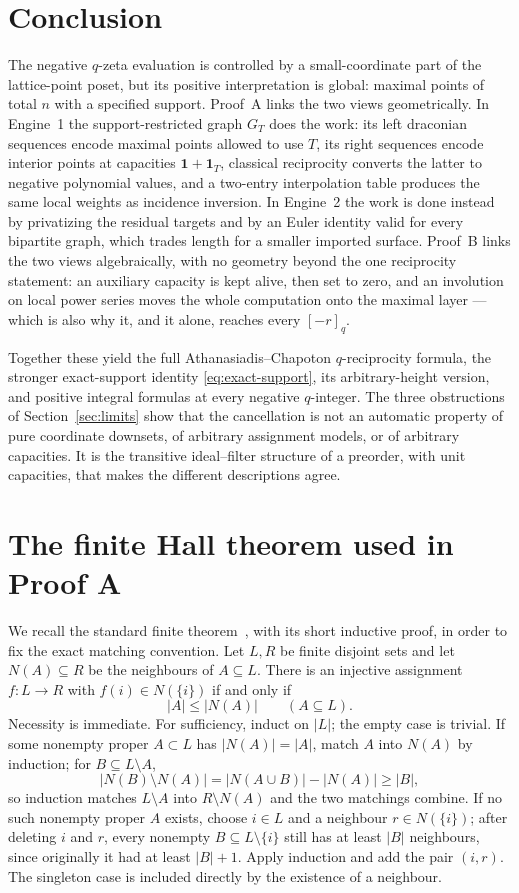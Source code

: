 \documentclass[11pt]{article}
\numberwithin{equation}{section}
\theoremstyle{definition}
\theoremstyle{remark}
\newcommand{\one}{\mathbf 1}
\newcommand{\qint}[1]{[#1]_q}
\begin{document}
\section{Conclusion}

The negative $q$-zeta evaluation is controlled by a small-coordinate part of
the lattice-point poset, but its positive interpretation is global: maximal
points of total $n$ with a specified support. Proof~A links the two views
geometrically. In Engine~1 the support-restricted graph $G_T$ does the work:
its left draconian sequences encode maximal points allowed to use $T$, its
right sequences encode interior points at capacities $\one+\one_T$, classical
reciprocity converts the latter to negative polynomial values, and a two-entry
interpolation table produces the same local weights as incidence inversion. In
Engine~2 the work is done instead by privatizing the residual targets and by
an Euler identity valid for every bipartite graph, which trades length for a
smaller imported surface. Proof~B links the two views algebraically, with no
geometry beyond the one reciprocity statement: an auxiliary capacity is kept
alive, then set to zero, and an involution on local power series moves the
whole computation onto the maximal layer --- which is also why it, and it
alone, reaches every $\qint{-r}$.

Together these yield the full Athanasiadis--Chapoton $q$-reciprocity formula,
the stronger exact-support identity \eqref{eq:exact-support}, its
arbitrary-height version, and positive integral formulas at every negative
$q$-integer. The three obstructions of Section~\ref{sec:limits} show that the
cancellation is not an automatic property of pure coordinate downsets, of
arbitrary assignment models, or of arbitrary capacities. It is the transitive
ideal--filter structure of a preorder, with unit capacities, that makes the
different descriptions agree.

\appendix

\section{The finite Hall theorem used in Proof A}
\label{app:hall}

We recall the standard finite theorem~\cite{Hall}, with its short inductive
proof, in order to fix the exact matching convention. Let $L,R$ be finite
disjoint sets and let $N(A)\subseteq R$ be the neighbours of $A\subseteq L$.
There is an injective assignment $f:L\to R$ with $f(i)\in N(\{i\})$ if and
only if
\[
 |A|\le|N(A)|\qquad(A\subseteq L).
\]
Necessity is immediate. For sufficiency, induct on $|L|$; the empty case is
trivial. If some nonempty proper $A\subset L$ has $|N(A)|=|A|$, match $A$ into
$N(A)$ by induction; for $B\subseteq L\setminus A$,
\[
 |N(B)\setminus N(A)|=|N(A\cup B)|-|N(A)|\ge|B| ,
\]
so induction matches $L\setminus A$ into $R\setminus N(A)$ and the two
matchings combine. If no such nonempty proper $A$ exists, choose $i\in L$ and
a neighbour $r\in N(\{i\})$; after deleting $i$ and $r$, every nonempty
$B\subseteq L\setminus\{i\}$ still has at least $|B|$ neighbours, since
originally it had at least $|B|+1$. Apply induction and add the pair $(i,r)$.
The singleton case is included directly by the existence of a neighbour.
\end{document}
